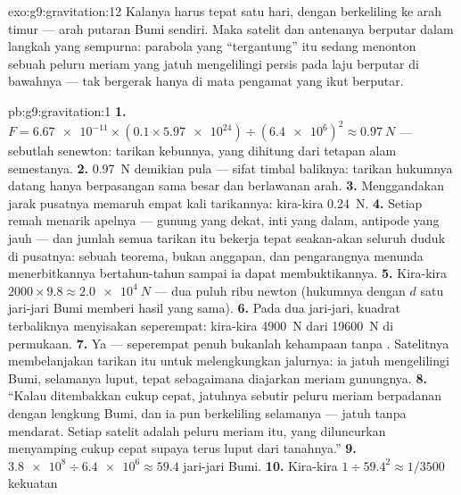 \begin{solution}{exo:g9:gravitation:12}
Kalanya harus tepat satu hari, dengan berkeliling ke arah timur ---
arah putaran Bumi sendiri. Maka satelit dan antenanya berputar dalam
langkah yang sempurna: parabola yang ``tergantung'' itu sedang
menonton sebuah peluru meriam yang jatuh mengelilingi  persis
pada laju  berputar di bawahnya --- tak bergerak hanya di mata
pengamat yang ikut berputar.
\end{solution}

\begin{solution}{pb:g9:gravitation:1}
\textbf{1.} $F = \num{6.67e-11} \times (0.1 \times
\num{5.97e24}) \div (\num{6.4e6})^2 \approx \qty{0.97}{N}$
--- sebutlah senewton: tarikan kebunnya, yang dihitung dari tetapan
alam semestanya.
\textbf{2.} \qty{0.97}{N} demikian pula --- sifat timbal baliknya:
tarikan hukumnya datang hanya berpasangan sama besar dan berlawanan
arah.
\textbf{3.} Menggandakan jarak pusatnya memaruh empat kali tarikannya:
kira-kira \qty{0.24}{N}.
\textbf{4.} Setiap remah  menarik apelnya --- gunung yang
dekat, inti yang dalam, antipode yang jauh --- dan jumlah semua
tarikan itu bekerja tepat seakan-akan seluruh  duduk di
pusatnya: sebuah teorema, bukan anggapan, dan pengarangnya menunda
menerbitkannya bertahun-tahun sampai ia dapat membuktikannya.
\textbf{5.} Kira-kira $2000 \times 9.8 \approx \qty{2.0e4}{N}$
--- dua puluh ribu newton (hukumnya dengan $d$ satu jari-jari Bumi
memberi hasil yang sama).
\textbf{6.} Pada dua jari-jari, kuadrat terbaliknya menyisakan
seperempat: kira-kira \qty{4900}{N} dari \qty{19600}{N}  di
permukaan.
\textbf{7.} Ya --- seperempat  penuh bukanlah kehampaan tanpa
. Satelitnya membelanjakan tarikan itu untuk melengkungkan
jalurnya: ia jatuh mengelilingi Bumi, selamanya luput, tepat
sebagaimana diajarkan meriam gunungnya.
\textbf{8.} ``Kalau ditembakkan cukup cepat, jatuhnya sebutir peluru
meriam berpadanan dengan lengkung Bumi, dan ia pun berkeliling
selamanya --- jatuh tanpa mendarat. Setiap satelit adalah peluru
meriam itu, yang diluncurkan menyamping cukup cepat supaya terus
luput dari tanahnya.''
\textbf{9.} $\num{3.8e8} \div \num{6.4e6} \approx 59.4$
jari-jari Bumi.
\textbf{10.} Kira-kira $1 \div 59.4^2 \approx 1/3500$ kekuatan

\end{solution}
